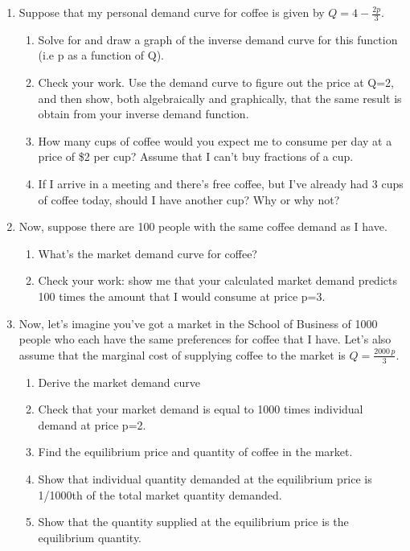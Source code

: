 \documentclass[11pt,]{article}
\providecommand{\tightlist}{%
  \setlength{\itemsep}{0pt}\setlength{\parskip}{0pt}}
\begin{document}
\begin{enumerate}
\def\labelenumi{\arabic{enumi}.}
\item
  Suppose that my personal demand curve for coffee is given by
  \(Q=4-\frac{2p}{3}\).

  \begin{enumerate}
  \def\labelenumii{\alph{enumii})}
  \item
    Solve for and draw a graph of the inverse demand curve for this
    function (i.e p as a function of Q).
  \item
    Check your work. Use the demand curve to figure out the price at
    Q=2, and then show, both algebraically and graphically, that the
    same result is obtain from your inverse demand function.
  \item
    How many cups of coffee would you expect me to consume per day at a
    price of \$2 per cup? Assume that I can't buy fractions of a cup.
  \item
    If I arrive in a meeting and there's free coffee, but I've already
    had 3 cups of coffee today, should I have another cup? Why or why
    not?
  \end{enumerate}
\item
  Now, suppose there are 100 people with the same coffee demand as I
  have.

  \begin{enumerate}
  \def\labelenumii{\alph{enumii})}
  \tightlist
  \item
    What's the market demand curve for coffee?
  \item
    Check your work: show me that your calculated market demand predicts
    100 times the amount that I would consume at price p=3.
  \end{enumerate}
\item
  Now, let's imagine you've got a market in the School of Business of
  1000 people who each have the same preferences for coffee that I have.
  Let's also assume that the marginal cost of supplying coffee to the
  market is \(Q=\frac{2000\,p}{3}\).

  \begin{enumerate}
  \def\labelenumii{\alph{enumii})}
  \tightlist
  \item
    Derive the market demand curve
  \item
    Check that your market demand is equal to 1000 times individual
    demand at price p=2.
  \item
    Find the equilibrium price and quantity of coffee in the market.
  \item
    Show that individual quantity demanded at the equilibrium price is
    1/1000th of the total market quantity demanded.
  \item
    Show that the quantity supplied at the equilibrium price is the
    equilibrium quantity.
  \end{enumerate}
\end{enumerate}
\end{document}

